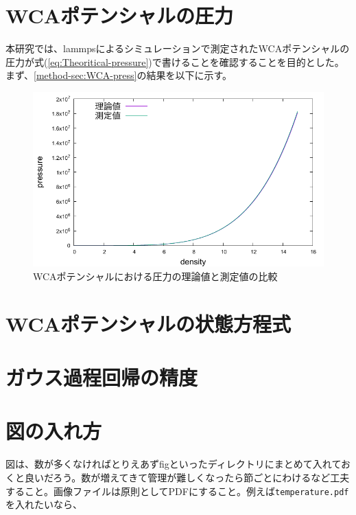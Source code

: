 \documentclass[titlepage]{jsreport}
\begin{document}
\section{WCAポテンシャルの圧力}\label{results-sec:WCA-press}
本研究では、lammpsによるシミュレーションで測定されたWCAポテンシャルの圧力が式(\ref{eq:Theoritical-pressure})で書けることを確認することを目的とした。
まず、\ref{method-sec:WCA-press}の結果を以下に示す。
\begin{figure}[htbp]
    \begin{center}
        \includegraphics[width=15cm]{fig/compare:den-pre.pdf}
    \end{center}
    \caption{WCAポテンシャルにおける圧力の理論値と測定値の比較}
    \label{fig:temperature}
\end{figure}







\section{WCAポテンシャルの状態方程式}

\section{ガウス過程回帰の精度}


\section{図の入れ方}

図は、数が多くなければとりえあずfigといったディレクトリにまとめて入れておくと良いだろう。数が増えてきて管理が難しくなったら節ごとにわけるなど工夫すること。画像ファイルは原則としてPDFにすること。例えば\verb|temperature.pdf|を入れたいなら、
\end{document}
